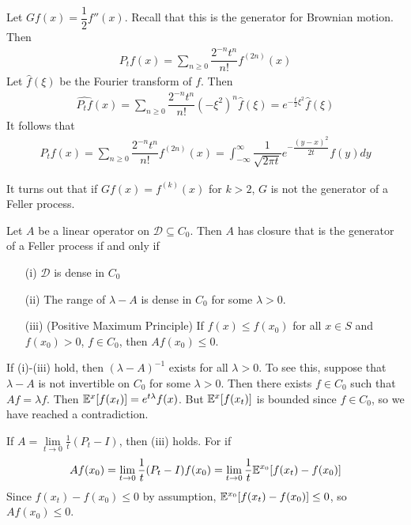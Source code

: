 \documentclass[classnotes]{fillsntsx}
\begin{document}
\begin{exmp}
Let $Gf(x) = \dfrac{1}{2} f''(x)$. Recall that this is the generator for Brownian motion. 
Then 
$$\begin{aligned}
P_t f(x) =  \sum_{n \geq 0} \dfrac{2^{-n}t^{n}}{n!} f^{(2n)}(x) 
\end{aligned}$$
Let $\widehat{f}(\xi)$ be the Fourier transform of $f$. Then
$$\begin{aligned}
\widehat{P_t f}(x) =  \sum_{n \geq 0} \dfrac{2^{-n}t^{n}}{n!} (-\xi^2)^{n} \hat{f}(\xi) = e^{-\frac{t}{2} \xi^2} \widehat{f}(\xi)
\end{aligned}$$
It follows that
$$\begin{aligned}
P_t f(x) =  \sum_{n \geq 0} \dfrac{2^{-n}t^{n}}{n!} f^{(2n)}(x) 
= 
\int_{-\infty}^{\infty} \dfrac{1}{\sqrt{ 2 \pi t }} e^{-\dfrac{ (y-x)^2}{2t}} f(y) dy
\end{aligned}$$
\end{exmp}

It turns out that if $Gf(x) = f^{(k)}(x)$ for $k > 2$, $G$ is not the generator of a Feller process.

\begin{thm}
Let $A$ be a linear operator on $\mathcal{D} \subseteq C_0$.
Then $A$ has closure that is the generator of a Feller process if and only if
\begin{enumerate}
\item[(i)] $\mathcal{D}$ is dense in $C_0$
\item[(ii)] The range of $\lambda - A$ is dense in $C_0$ for some $\lambda > 0$. 
\item[(iii)] (Positive Maximum Principle) If $f(x) \leq f(x_0)$ for all $x \in S$ and $f(x_0) > 0$, $f \in C_0$, then $A f(x_0) \leq 0$.
\end{enumerate}
\end{thm}

\begin{note}
If (i)-(iii) hold, then $(\lambda - A)^{-1}$ exists for all $\lambda > 0$. To see this, suppose that $\lambda - A$ is not invertible on $C_0$ for some $\lambda > 0$. 
Then there exists $f \in C_0$ such that $Af = \lambda f$. Then $\mathbb{E}^x[f(x_t)] =e^{t \lambda} f(x)$. But $\mathbb{E}^x[f(x_t)]$ is bounded since $f \in C_0$, so we have reached a contradiction. 
\end{note}

\begin{note}
If $A = \lim\limits_{t \to 0} \frac{1}{t} (P_t - I)$, then (iii) holds. For if
$$\begin{aligned}
A f(x_0) =  \lim\limits_{t \to 0} \frac{1}{t} (P_t - I) f(x_0) =  \lim_{t \to 0} \frac{1}{t} \mathbb{E}^{x_0} [f(x_t) - f(x_0)]
\end{aligned}$$
Since $f(x_t) - f(x_0) \leq 0$ by assumption, $\mathbb{E}^{x_0} [f(x_t) - f(x_0)] \leq 0$, so $A f(x_0) \leq 0$. 
\end{note}

%
\end{document}
